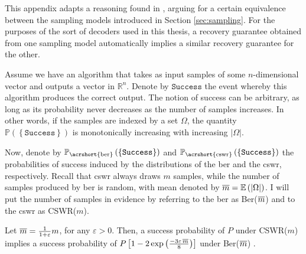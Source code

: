 This appendix adapts a reasoning found in \cite[Appendix]{candes2011a}, arguing for a certain equivalence between the sampling models introduced in Section \ref{sec:sampling}. For the purposes of the sort of decoders used in this thesis, a recovery guarantee obtained from one sampling model automatically implies a similar recovery guarantee for the other.

Assume we have an algorithm that takes as input samples of some $n$-dimensional vector and outputs a vector in $\mathbb{R}^{n}$. Denote by $\texttt{Success}$ the event whereby this algorithm produces the correct output. The notion of success can be arbitrary, as long as its probability never decreases as the number of samples increases. In other words, if the samples are indexed by a set $\Omega$, the quantity $\mathbb{P} \left ( \left \{ \texttt{Success} \right \}\right )$ is monotonically increasing with increasing $|\Omega|$.

Now, denote by $\mathbb{P}_{\text{\acrshort{ber}}} \left ( \left \{  \texttt{Success} \right \}\right )$ and $\mathbb{P}_{\text{\acrshort{cswr}}} \left ( \left \{  \texttt{Success} \right \}\right )$ the probabilities of success induced by the distributions of the \acrfull{ber} and the \acrfull{cswr}, respectively. Recall that \acrshort{cswr} always draws $m$ samples, while the number of samples produced by \acrshort{ber} is random, with mean denoted by $\mathop{\overline{m}} = \mathbb{E} \left ( |\Omega| \right )$. I will put the number of samples in evidence by referring to the \acrlong{ber} as Ber($\mathop{\overline{m}}$) and to the \acrlong{cswr} as CSWR($m$).

\begin{lemma}
    Let $\mathop{\overline{m}} = \frac{1}{1 + \varepsilon} m$, for any $\varepsilon > 0$. Then, a success probability of $P$ under CSWR($m$) implies a success probability of $P \left [ 1 - 2 \exp \left ( \frac{-3 \varepsilon \mathop{\overline{m}}}{8} \right ) \right ]$ under Ber($\mathop{\overline{m}}$) .
\end{lemma}

